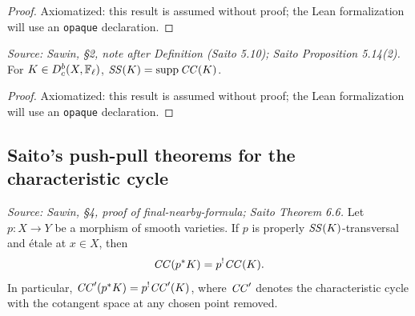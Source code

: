 \begin{proof}
  Axiomatized: this result is assumed without proof; the Lean formalization will use
  an \texttt{opaque} declaration.
\end{proof}

\begin{theorem}
  \label{thm:saito_prop_514}
  \textit{Source: Sawin, §2, note after Definition (Saito 5.10); Saito Proposition 5.14(2).}
  For $K\in D^b_c(X,\mathbb{F}_\ell)$, $\mathit{SS}(K) = \operatorname{supp}\mathit{CC}(K)$.
\end{theorem}

\begin{proof}
  Axiomatized: this result is assumed without proof; the Lean formalization will use
  an \texttt{opaque} declaration.
\end{proof}

\subsection{Saito's push-pull theorems for the characteristic cycle}

\begin{theorem}
  \label{thm:saito_cc_pullback}
  \textit{Source: Sawin, §4, proof of final-nearby-formula; Saito Theorem 6.6.}
  Let $p:X\to Y$ be a morphism of smooth varieties.  If $p$ is properly
  $\mathit{SS}(K)$-transversal and étale at $x\in X$, then
  \[ \mathit{CC}(p^*K) = p^!\mathit{CC}(K). \]
  In particular, $\mathit{CC}'(p^*K) = p^!\mathit{CC}'(K)$, where $\mathit{CC}'$ denotes the
  characteristic cycle with the cotangent space at any chosen point removed.
\end{theorem}

